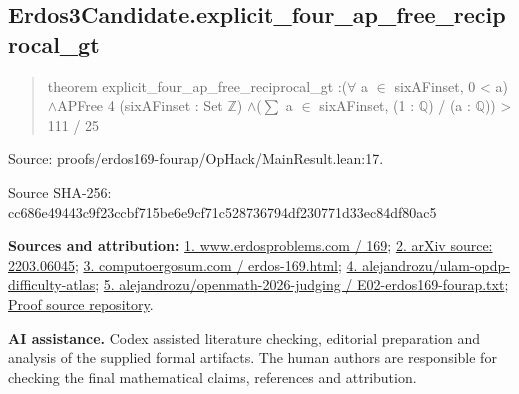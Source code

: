 \documentclass[11pt,a4paper]{article}
\begin{document}
\begin{samepage}
\subsection{Erdos3Candidate.explicit\_four\_ap\_free\_reciprocal\_gt}
\begin{quote}\small\ttfamily theorem explicit\_four\_ap\_free\_reciprocal\_gt :\newline     (\ensuremath{\forall} a \ensuremath{\in} sixAFinset, 0 < a) \ensuremath{\wedge}\newline       APFree 4 (sixAFinset : Set \ensuremath{\mathbb{Z}}) \ensuremath{\wedge}\newline       (\ensuremath{\sum} a \ensuremath{\in} sixAFinset, (1 : \ensuremath{\mathbb{Q}}) / (a : \ensuremath{\mathbb{Q}})) > 111 / 25\end{quote}
{\small Source: proofs/erdos169-fourap/OpHack/MainResult.lean:17.\par}

{\small Source SHA-256: cc686e49443c9f23ccbf715be6e9cf71c528736794df230771d33ec84df80ac5\par}

{\small\textbf{Sources and attribution:} \href{https://www.erdosproblems.com/169}{1. www.erdosproblems.com / 169}; \href{https://arxiv.org/abs/2203.06045}{2. arXiv source: 2203.06045}; \href{https://computoergosum.com/en/principia/erdos-169.html}{3. computoergosum.com / erdos-169.html}; \href{https://github.com/alejandrozu/ulam-opdp-difficulty-atlas}{4. alejandrozu/ulam-opdp-difficulty-atlas}; \href{https://github.com/alejandrozu/openmath-2026-judging/blob/d0ed487f487fa7ec814ff705ab55249983fe8707/OpenMath-Judging/review/entries/E02-erdos169-fourap.txt}{5. alejandrozu/openmath-2026-judging / E02-erdos169-fourap.txt}; \href{https://github.com/alejandrozu/openmath-2026-judging}{Proof source repository}.\par}

\end{samepage}
{\small \textbf{AI assistance.} Codex assisted literature checking, editorial preparation and analysis of the supplied formal artifacts. The human authors are responsible for checking the final mathematical claims, references and attribution.\par}
\end{document}
